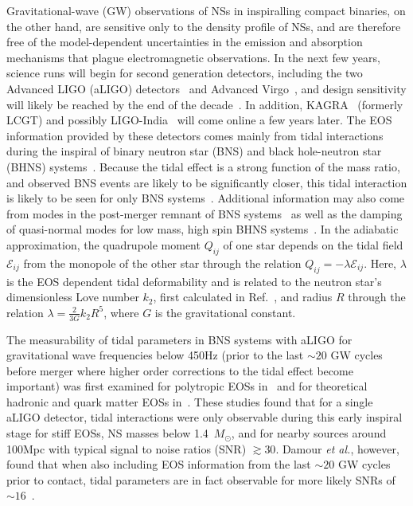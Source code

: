 \documentclass[twocolumn,prd,amssymb,aps,nofootinbib,showpacs,epsf]{revtex4}
\begin{document}
Gravitational-wave (GW) observations of NSs in inspiralling compact binaries, on the other hand, are sensitive only to the density profile of NSs, and are therefore free of the model-dependent uncertainties in the emission and absorption mechanisms that plague electromagnetic observations. In the next few years, science runs will begin for second generation detectors, including the two Advanced LIGO (aLIGO) detectors~\cite{Harry2010} and Advanced Virgo~\cite{Acernese2009}, and design sensitivity will likely be reached by the end of the decade~\cite{AasiAbadieAbbott2013}. In addition, \mbox{KAGRA}~\cite{Somiya2012} (formerly LCGT) and possibly LIGO-India~\cite{IyerSouradeepUnnikrishnan2011} will come online a few years later. The EOS information provided by these detectors comes mainly from tidal interactions during the inspiral of binary neutron star (BNS) and black hole-neutron star (BHNS) systems~\cite{FlanaganHinderer2008}. Because the tidal effect is a strong function of the mass ratio, and observed BNS events are likely to be significantly closer, this tidal interaction is likely to be seen for only BNS systems~\cite{PannaraleRezzollaOhmeRead2011}. Additional information may also come from modes in the post-merger remnant of BNS systems~\cite{StergioulasBausweinZagkouris2011, ClarkBausweinCadonati2014} as well as the damping of quasi-normal modes for low mass, high spin BHNS systems~\cite{LackeyKyutokuShibata2014}. In the adiabatic approximation, the quadrupole moment $Q_{ij}$ of one star depends on the tidal field $\mathcal{E}_{ij}$ from the monopole of the other star through the relation $Q_{ij} = -\lambda \mathcal{E}_{ij}$. Here, $\lambda$ is the EOS dependent tidal deformability and is related to the neutron star's dimensionless Love number $k_2$, first calculated in Ref.~\cite{Hinderer2008}, and radius $R$ through the relation $\lambda = \frac{2}{3G} k_2 R^5$, where $G$ is the gravitational constant.
 
The measurability of tidal parameters in BNS systems with aLIGO for gravitational wave frequencies below 450Hz (prior to the last $\sim 20$ GW cycles before merger where higher order corrections to the tidal effect become important) was first examined for polytropic EOSs in~\cite{FlanaganHinderer2008} and for theoretical hadronic and quark matter EOSs in~\cite{HindererLackeyLangRead2010}.  These studies found that for a single aLIGO detector, tidal interactions were only observable during this early inspiral stage for stiff EOSs, NS masses below 1.4~$M_\odot$, and for nearby sources around 100Mpc with typical signal to noise ratios (SNR) $\gtrsim 30$. Damour {\it et al.}, however, found that when also including EOS information from the last $\sim 20$ GW cycles prior to contact, tidal parameters are in fact observable for more likely SNRs of $\sim 16$~\cite{DamourNagarVillain2012}. 
\end{document}
